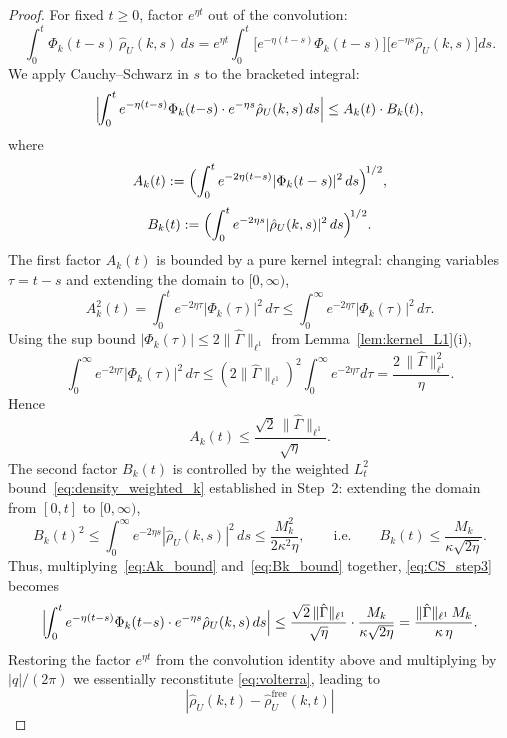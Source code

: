 \documentclass[11pt]{amsart}
\theoremstyle{definition}
\begin{document}
\begin{proof}
For fixed $t\ge 0$, factor $e^{\eta t}$ out of the convolution:
\[
  \int_0^t\Phi_k(t{-}s)\,
  \hat\rho_U(k,s)\,ds
  = e^{\eta t}\!
  \int_0^t
  \bigl[e^{-\eta(t-s)}\Phi_k(t{-}s)\bigr]
  \bigl[e^{-\eta s}\hat\rho_U(k,s)\bigr]ds.
\]
We apply Cauchy--Schwarz in $s$ to the bracketed integral:
\begin{equation}\label{eq:CS_step3}
  \Bigl|\!\int_0^t
  e^{-\eta(t-s)}\Phi_k(t{-}s)\cdot
  e^{-\eta s}\hat\rho_U(k,s)\,ds\Bigr|
  \le A_k(t)\cdot B_k(t),
\end{equation}
where
\[
  A_k(t)
  := \Bigl(\int_0^t
  e^{-2\eta(t-s)}|\Phi_k(t-s)|^2\,ds\Bigr)^{\!1/2},
\]
\[
  B_k(t)
  := \Bigl(\int_0^t
  e^{-2\eta s}|\hat\rho_U(k,s)|^2\,ds\Bigr)^{\!1/2}.
\]
The first factor $A_k(t)$ is bounded by a pure kernel integral: changing variables $\tau=t-s$ and extending the domain to $[0,\infty)$,
\[
  A_k^2(t)
  = \int_0^t e^{-2\eta\tau}
  |\Phi_k(\tau)|^2\,d\tau
  \le \int_0^\infty e^{-2\eta\tau}
  |\Phi_k(\tau)|^2\,d\tau.
\]
Using the sup bound $|\Phi_k(\tau)|\le 2\|\hat\Gamma\|_{\ell^1}$ from Lemma~\ref{lem:kernel_L1}(i),
\[
  \int_0^\infty e^{-2\eta\tau}
  |\Phi_k(\tau)|^2\,d\tau
  \le (2\|\hat\Gamma\|_{\ell^1})^2
  \int_0^\infty e^{-2\eta\tau}d\tau
  = \frac{2\,\|\hat\Gamma\|_{\ell^1}^2}{\eta}.
\]
Hence
\begin{equation}\label{eq:Ak_bound}
  A_k(t)
  \le \frac{\sqrt{2}\,\|\hat\Gamma\|_{\ell^1}}
  {\sqrt{\eta}}.
\end{equation}
The second factor $B_k(t)$ is controlled by the weighted $L^2_t$ bound~\eqref{eq:density_weighted_k} established in Step~2: extending the domain from $[0,t]$ to $[0,\infty)$,
\begin{equation}\label{eq:Bk_bound}
  B_k(t)^2
  \le \int_0^\infty e^{-2\eta s}
  |\hat\rho_U(k,s)|^2\,ds
  \le \frac{M_k^2}{2\kappa^2\eta},
  \qquad\text{i.e.}\qquad
  B_k(t)\le \frac{M_k}{\kappa\sqrt{2\eta}}.
\end{equation}
Thus, multiplying~\eqref{eq:Ak_bound} and~\eqref{eq:Bk_bound} together, \eqref{eq:CS_step3} becomes
\[
  \Bigl|\!\int_0^t
  e^{-\eta(t-s)}\Phi_k(t{-}s)\cdot
  e^{-\eta s}\hat\rho_U(k,s)\,ds\Bigr|
  \le \frac{\sqrt{2}\,\|\hat\Gamma\|_{\ell^1}}
  {\sqrt{\eta}}\cdot
  \frac{M_k}{\kappa\sqrt{2\eta}}
  = \frac{\|\hat\Gamma\|_{\ell^1}\,M_k}
  {\kappa\,\eta}.
\]
Restoring the factor $e^{\eta t}$ from the convolution identity above and multiplying by $|q|/(2\pi)$ we essentially reconstitute \eqref{eq:volterra}, leading to
\begin{equation}\label{eq:density_pointwise_k}
  |\hat\rho_U(k,t)-\hat\rho_U^{\mathrm{free}}(k,t)|

\end{equation}
\end{proof}
\end{document}
